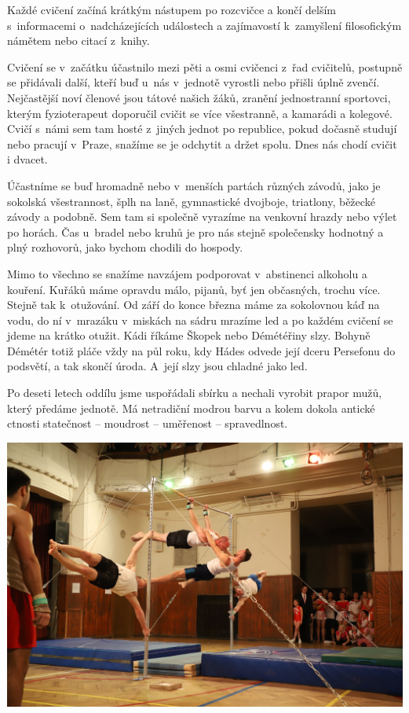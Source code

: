 \documentclass[a5paper, 11pt, twoside]{article}
\begin{document}
Každé cvičení začíná krátkým nástupem po rozcvičce a končí delším
s~informacemi o~nadcházejících událostech a zajímavostí k~zamyšlení
filosofickým námětem nebo citací z~knihy.

Cvičení se v~začátku účastnilo mezi pěti a osmi cvičenci z~řad
cvičitelů, postupně se přidávali další, kteří buď u~nás v~jednotě
vyrostli nebo přišli úplně zvenčí. Nejčastější noví členové jsou tátové
našich žáků, zranění jednostranní sportovci, kterým fyzioterapeut
doporučil cvičit se více všestranně, a kamarádi a kolegové. Cvičí s~námi
sem tam hosté z~jiných jednot po republice, pokud dočasně studují nebo
pracují v~Praze, snažíme se je odchytit a držet spolu. Dnes nás chodí
cvičit i dvacet.

Účastníme se buď hromadně nebo v~menších partách různých závodů, jako je
sokolská všestrannost, šplh na laně, gymnastické dvojboje, triatlony,
běžecké závody a podobně. Sem tam si společně vyrazíme na venkovní
hrazdy nebo výlet po horách. Čas u~bradel nebo kruhů je pro nás stejně
společensky hodnotný a plný rozhovorů, jako bychom chodili do hospody.

Mimo to všechno se snažíme navzájem podporovat v~abstinenci alkoholu a
kouření. Kuřáků máme opravdu málo, pijanů, byť jen občasných, trochu
více. Stejně tak k~otužování. Od září do konce března máme za sokolovnou
káď na vodu, do ní v~mrazáku v~miskách na sádru mrazíme led a po každém
cvičení se jdeme na krátko otužit. Kádi říkáme Škopek nebo Démétéřiny
slzy. Bohyně Démétér totiž pláče vždy na půl roku, kdy Hádes odvede její
dceru Persefonu do podsvětí, a tak skončí úroda. A~její slzy jsou
chladné jako led.

Po deseti letech oddílu jsme uspořádali sbírku a nechali vyrobit prapor
mužů, který předáme jednotě. Má netradiční modrou barvu a kolem dokola
antické ctnosti statečnost -- moudrost -- uměřenost -- spravedlnost.

 \includegraphics[width=\textwidth]{img/75_akademie_muzi.JPG}
\end{document}
